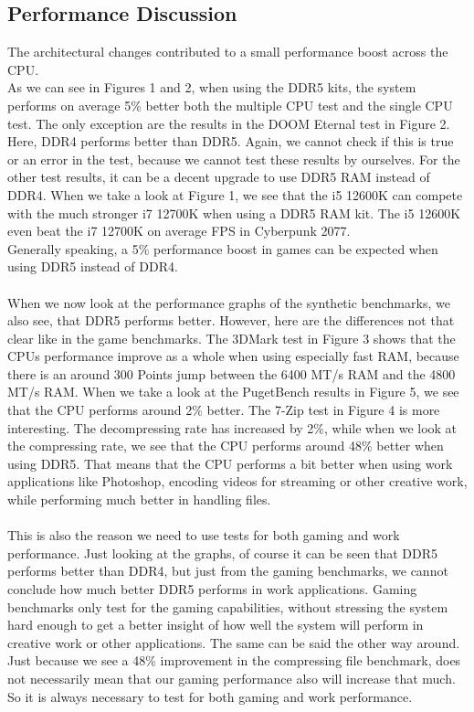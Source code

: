 \subsection{Performance Discussion}

The architectural changes contributed to a small performance boost across the CPU. 
\\
As we can see in Figures 1 and 2, when using the DDR5 kits, the system performs on average 5\% better both the multiple CPU test and the single CPU test. The only exception are the results in the DOOM Eternal test in Figure 2. Here, DDR4 performs better than DDR5. Again, we cannot check if this is true or an error in the test, because we cannot test these results by ourselves. For the other test results, it can be a decent upgrade to use DDR5 RAM instead of DDR4. When we take a look at Figure 1, we see that the i5 12600K can compete with the much stronger i7 12700K when using a DDR5 RAM kit. The i5 12600K even beat the i7 12700K on average FPS in Cyberpunk 2077. 
\\
Generally speaking, a 5\% performance boost in games can be expected when using DDR5 instead of DDR4.
\\
\\
When we now look at the performance graphs of the synthetic benchmarks, we also see, that DDR5 performs better. However, here are the differences not that clear like in the game benchmarks. The 3DMark test in Figure 3 shows that the CPUs performance improve as a whole when using especially fast RAM, because there is an around 300 Points jump between the 6400 MT/s RAM and the 4800 MT/s RAM. When we take a look at the PugetBench results in Figure 5, we see that the CPU performs around 2\% better. The 7-Zip test in Figure 4 is more interesting. The decompressing rate has increased by 2\%, while when we look at the compressing rate, we see that the CPU performs around 48\% better when using DDR5. That means that the CPU performs a bit better when using work applications like Photoshop, encoding videos for streaming or other creative work, while performing much better in handling files. 
\\
\\
This is also the reason we need to use tests for both gaming and work performance. Just looking at the graphs, of course it can be seen that DDR5 performs better than DDR4, but just from the gaming benchmarks, we cannot conclude how much better DDR5 performs in work applications. Gaming benchmarks only test for the gaming capabilities, without stressing the system hard enough to get a better insight of how well the system will perform in creative work or other applications. The same can be said the other way around. Just because we see a 48\% improvement in the compressing file benchmark, does not necessarily mean that our gaming performance also will increase that much. So it is always necessary to test for both gaming and work performance.

